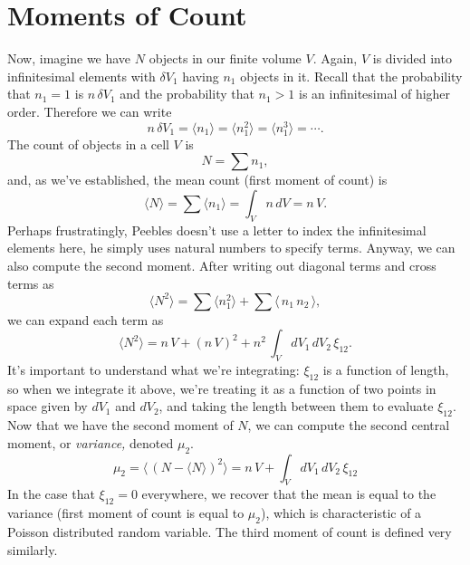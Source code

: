 \documentclass{article}
\begin{document}
\section{Moments of Count}
Now, imagine we have $N$ objects in our finite volume $V$. Again, $V$ is divided into infinitesimal elements with $\delta V_1$ having $n_1$ objects in it. Recall that the probability that $n_1=1$ is $n\,\delta V_1$ and the probability that $n_1>1$ is an infinitesimal of higher order. Therefore we can write
\[
n\,\delta V_1=\langle n_1\rangle=\langle n_1^2\rangle=\langle n_1^3\rangle=\cdots.\tag{Peebles 36.1}
\]
The count of objects in a cell $V$ is
\[
N=\sum n_1,\tag{Peebles 36.3}
\]
and, as we've established, the mean count (first moment of count) is
\[
\langle N\rangle=\sum \langle n_1\rangle=\int_V n\,dV=n\,V.\tag{Peebles 36.4}
\]
Perhaps frustratingly, Peebles doesn't use a letter to index the infinitesimal elements here, he simply uses natural numbers to specify terms.
Anyway, we can also compute the second moment.
After writing out diagonal terms and cross terms as
\[
\langle N^2\rangle=\sum\langle n_1^2\rangle+\sum\langle \,n_1\,n_2\,\rangle,\tag{Peebles 36.5}
\]
we can expand each term as
\[
\langle N^2\rangle=n\,V+(n\,V)^2+n^2\,\int_V dV_1\,dV_2\,\xi_{12}.\tag{Peebles 36.6}
\]
It's important to understand what we're integrating: $\xi_{12}$ is a function of length, so when we integrate it above, we're treating it as a function of two points in space given by $dV_1$ and $dV_2$, and taking the length between them to evaluate $\xi_{12}$.
Now that we have the second moment of $N$, we can compute the second central moment, or \textit{variance,} denoted $\mu_2$.
\[
\mu_2=\langle\,(N-\langle N\rangle)^2\rangle=n\,V+\int_V dV_1\,dV_2\,\xi_{12}
\]
In the case that $\xi_{12}=0$ everywhere, we recover that the mean is equal to the variance (first moment of count is equal to $\mu_2$), which is characteristic of a Poisson distributed random variable.
The third moment of count is defined very similarly.
\end{document}
